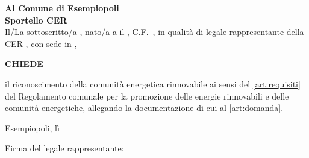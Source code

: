 \documentclass[%
  bozza,          %
  sansserif,      %
  simplex,        %
  12pt            %
]{attinormativi}
\begin{document}
\noindent\textbf{Al Comune di Esempiopoli}\\
\textbf{Sportello CER}\\[1em]

Il/La sottoscritto/a \underline{\hspace{5cm}}, nato/a a
\underline{\hspace{3.5cm}} il \underline{\hspace{2cm}}, C.F.\
\underline{\hspace{4cm}}, in qualità di legale rappresentante della
CER \underline{\hspace{4cm}}, con sede in \underline{\hspace{4cm}},

\bigskip
\noindent\textbf{CHIEDE}

\noindent il riconoscimento della comunità energetica rinnovabile
ai sensi del \cref{art:requisiti} del Regolamento comunale per
la promozione delle energie rinnovabili e delle comunità energetiche,
allegando la documentazione di cui al \cref{art:domanda}.

\bigskip
\noindent Esempiopoli, lì \underline{\hspace{3cm}}

\bigskip
\noindent Firma del legale rappresentante: \underline{\hspace{5cm}}

%
\end{document}
